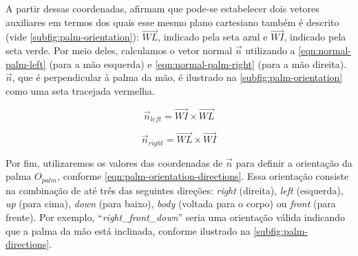 \begin{enumerate}
          A partir dessas coordenadas,  afirmam que pode-se estabelecer dois vetores auxiliares em termos dos quais esse mesmo plano cartesiano também é descrito (vide \autoref{subfig:palm-orientation}): \(\overrightarrow{WL}\), indicado pela seta azul e \(\overrightarrow{WI}\), indicado pela seta verde.
          Por meio deles, calculamos o vetor normal \(\overrightarrow{n}\) utilizando a \autoref{eqn:normal-palm-left} (para a mão esquerda) e \autoref{eqn:normal-palm-right} (para a mão direita). \(\overrightarrow{n}\), que é perpendicular à palma da mão, é ilustrado na \autoref{subfig:palm-orientation} como uma seta tracejada vermelha.


          \begin{equation}
              \label{eqn:normal-palm-left}
              \overrightarrow{n}_{left} = \overrightarrow{WI} \times \overrightarrow{WL}
          \end{equation}

          \begin{equation}
              \label{eqn:normal-palm-right}
              \overrightarrow{n}_{right} = \overrightarrow{WL} \times \overrightarrow{WI}
          \end{equation}

          Por fim, utilizaremos os valores das coordenadas de \(\overrightarrow{n}\) para definir a orientação da palma \(O_{palm}\), conforme \autoref{eqn:palm-orientation-directions}.
          Essa orientação consiste na combinação de até três das seguintes direções: \textit{right} (direita), \textit{left} (esquerda), \textit{up} (para cima), \textit{down} (para baixo), \textit{body} (voltada para o corpo) ou \textit{front} (para frente).
          Por exemplo, ``\textit{right\_front\_down}'' seria uma orientação válida indicando que a palma da mão está inclinada, conforme ilustrado na \autoref{subfig:palm-directions}.



\end{enumerate}

